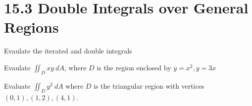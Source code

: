 \documentclass[12pt]{exam}
\newcommand{\qdate}{15.3 Double Integrals over General Regions} %
\begin{document}
\section*{\qdate}


\begin{questions}

\question Evaulate the iterated and double integrals

\newpage

\question Evaulate \(\iint_D xy~dA\), where \(D\) is the region enclosed by \(y=x^2, y=3x\)
    \ifprintanswers
        \begin{solution}
        \end{solution}
    \else
        \vfill
    \fi

\question Evaluate \(\iint_D y^2~dA\) where \(D\) is the triangular region with vertices \((0,1),(1,2),(4,1)\).
    \ifprintanswers
        \begin{solution}
        \end{solution}
    \else
        \vfill
    \fi


\end{questions}
\end{document}
